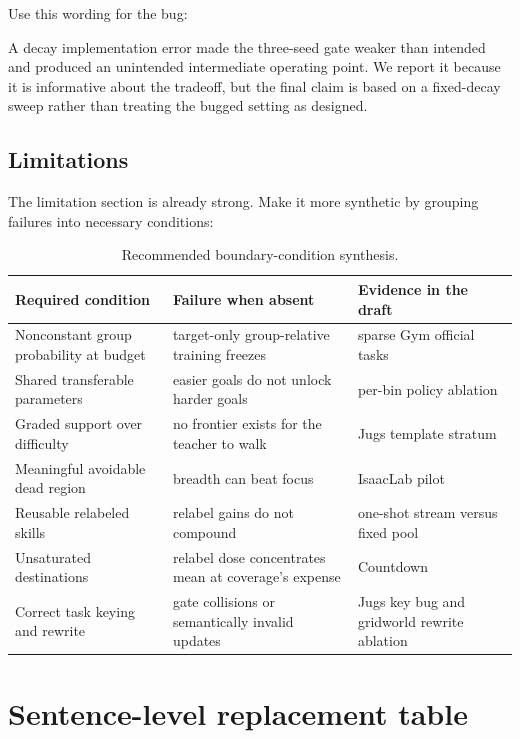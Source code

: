 \documentclass[11pt]{article}
\theoremstyle{definition}
\theoremstyle{remark}
\begin{document}
Use this wording for the bug:

\begin{rewritebox}
A decay implementation error made the three-seed gate weaker than intended and produced an unintended intermediate operating point. We report it because it is informative about the tradeoff, but the final claim is based on a fixed-decay sweep rather than treating the bugged setting as designed.
\end{rewritebox}

\subsection{Limitations}

The limitation section is already strong. Make it more synthetic by grouping failures into necessary conditions:

\begin{table}[H]
\centering
\small
\caption{Recommended boundary-condition synthesis.}
\begin{tabularx}{\textwidth}{@{}p{}p{}X@{}}
\toprule
\textbf{Required condition} & \textbf{Failure when absent} & \textbf{Evidence in the draft}\\
\midrule
Nonconstant group probability at budget & target-only group-relative training freezes & sparse Gym official tasks\\
Shared transferable parameters & easier goals do not unlock harder goals & per-bin policy ablation\\
Graded support over difficulty & no frontier exists for the teacher to walk & Jugs template stratum\\
Meaningful avoidable dead region & breadth can beat focus & IsaacLab pilot\\
Reusable relabeled skills & relabel gains do not compound & one-shot stream versus fixed pool\\
Unsaturated destinations & relabel dose concentrates mean at coverage's expense & Countdown\\
Correct task keying and rewrite & gate collisions or semantically invalid updates & Jugs key bug and gridworld rewrite ablation\\
\bottomrule
\end{tabularx}
\end{table}

\section{Sentence-level replacement table}
\end{document}
